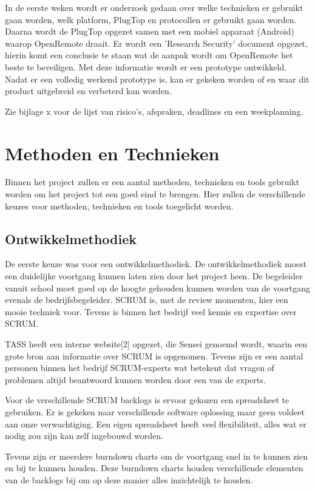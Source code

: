 \documentclass[]{article}
\begin{document}
In de eerste weken wordt  er  onderzoek  gedaan  over  welke  technieken  er
gebruikt gaan worden, welk platform,  PlugTop  en  protocollen  er  gebruikt
gaan worden. Daarna wordt de PlugTop opgezet samen met een  mobiel  apparaat
(Android)  waarop  OpenRemote  draait.  Er  wordt  een  'Research  Security'
document opgezet, hierin komt een conclusie te staan wat de aanpak wordt  om
OpenRemote het beste  te  beveiligen.  Met  deze  informatie  wordt  er  een
prototype ontwikkeld. Nadat er een volledig werkend  prototype  is,  kan  er
gekeken worden of en waar dit product uitgebreid en verbeterd kan worden.

Zie bijlage x voor de  lijst  van  risico's,  afspraken,  deadlines  en  een
weekplanning.

\newpage
\section{Methoden en Technieken}

Binnen het project zullen er een aantal methoden, technieken en tools
gebruikt worden om het project tot een goed eind te brengen. Hier zullen de
verschillende keuzes voor methoden, technieken en tools toegelicht worden.

\subsection{Ontwikkelmethodiek}
De eerste keuze was voor een ontwikkelmethodiek. De ontwikkelmethodiek
moest een duidelijke voortgang kunnen laten zien door het project heen. De
begeleider vanuit school moet goed op de hoogte gehouden kunnen worden van
de voortgang evenals de bedrijfsbegeleider. SCRUM is, met de review
momenten, hier een mooie techniek voor. Tevens is binnen het bedrijf veel
kennis en expertise over SCRUM.

TASS heeft een interne website[2] opgezet, die Sensei genoemd wordt, waarin
een grote bron aan informatie over SCRUM is opgenomen. Tevens zijn er een
aantal personen binnen het bedrijf SCRUM-experts wat betekent dat vragen of
problemen altijd beantwoord kunnen worden door een van de experts.

Voor de verschillende SCRUM backlogs is ervoor gekozen een spreadsheet te
gebruiken. Er is gekeken naar verschillende software oplossing maar geen
voldeet aan onze verwachtiging. Een eigen spreadsheet heeft veel
flexibiliteit, alles wat er nodig zou zijn kan zelf ingebouwd worden.

Tevens zijn er meerdere burndown charts om de voortgang snel in te kunnen
zien en bij te kunnen houden. Deze burndown charts houden verschillende
elementen van de backlogs bij om op deze manier alles inzichtelijk te
houden.
\end{document}
